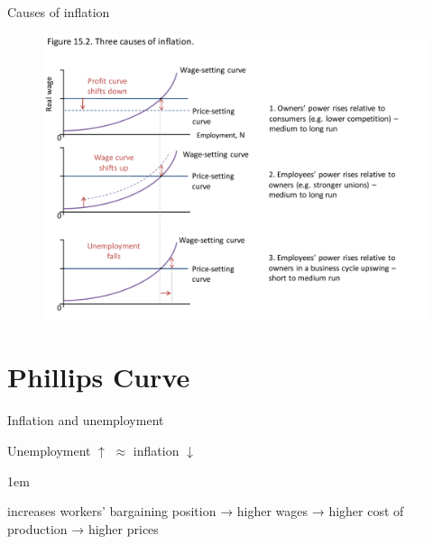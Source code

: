 \documentclass[11pt,aspectratio=43,usenames,dvipsnames]{beamer}
\let\olditemize=\itemize
\let\endolditemize=\enditemize
\renewenvironment{itemize}{\olditemize \itemsep1em}{\endolditemize}
\theoremstyle{definition}
\begin{document}
\begin{frame}{Causes of inflation}
\label{slide:Causes_of_inflation}
    \begin{figure}
        \centering
        \includegraphics[width=.9\textwidth]{./figures/2.pdf}
    \end{figure}
\end{frame}

\section[\faObjectGroup]{Phillips Curve}
\label{sec:Phillips_Curve}

\begin{frame}{Inflation and unemployment}
\label{slide:Inflation_and_unemployment}

\begin{center}
    Unemployment $ \uparrow  $ $ \approx $ inflation $ \downarrow  $
\end{center}

\begin{itemize}
    \item increases workers' bargaining position → higher wages → higher cost of production → higher prices
\end{itemize}



\end{frame}
\end{document}
